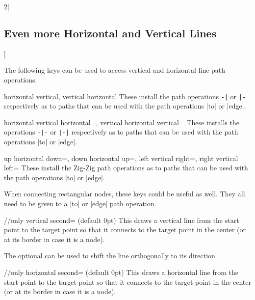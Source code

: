 \begin{multicols*}{2}[\subsection{Even more Horizontal and Vertical Lines}]

The following keys can be used to access vertical and horizontal line path operations.
\begin{keylist}[/\tikzext]{%
  horizontal vertical,
  vertical horizontal}
  These install the path operations \verb!-|! or \verb!|-! respectively as to paths%
   that can be used with the path operations |to| or |edge|.
\end{keylist}
\begin{keylist}[/\tikzext]{%
  horizontal vertical horizontal=,
  vertical horizontal vertical=}
  These installs the operations \verb!-|-! or \verb!|-|! respectively as to paths
  that can be used with the path operations |to| or |edge|.
\end{keylist}
\begin{keylist}[/\tikzext]{%
  up horizontal down=,
  down horizontal up=,
  left vertical right=,
  right vertical left=}
  These install the Zig-Zig path operations as to paths
  that can be used with the path operations |to| or |edge|.
\end{keylist}

When connecting rectangular nodes, these keys could be useful as well.
They all need to be given to a |to| or |edge| path operation.
\begin{stylekey}{/\tikzext/only vertical second= (default 0pt)}
This draws a vertical line from the start point to the target point so that
it connects to the target point in the center (or at its border in case it is a node).

The optional  can be used to shift the line orthogonally to its direction.
\end{stylekey}
\begin{stylekey}{/\tikzext/only horizontal second= (default 0pt)}
This draws a horizontal line from the start point to the target point so that
it connects to the target point in the center (or at its border in case it is a node).


\end{stylekey}
\end{multicols*}
